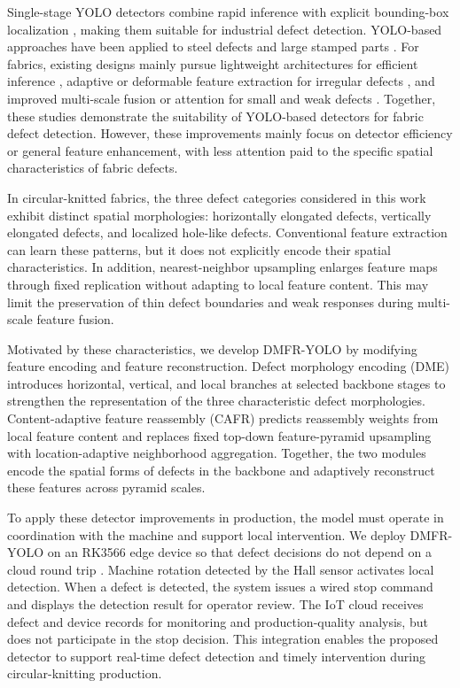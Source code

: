 \documentclass[journal]{IEEEtran}
\newcommand{\model}{DMFR-YOLO\xspace}
\begin{document}
Single-stage YOLO detectors combine rapid inference with explicit bounding-box localization \cite{redmon2016yolo}, making them suitable for industrial defect detection. YOLO-based approaches have been applied to steel defects and large stamped parts \cite{gao2024srnyolo,li2024yoloxsteel,dong2024snf}. For fabrics, existing designs mainly pursue lightweight architectures for efficient inference \cite{kang2024ayolov7,yang2024yolov4tinys}, adaptive or deformable feature extraction for irregular defects \cite{luo2023deformableyolo,zhang2025dghr}, and improved multi-scale fusion or attention for small and weak defects \cite{yue2022tiny,yu2024fayolo,chen2025yolov8,wang2025srseyolo,gao2026yolov8,xu2025yolodll}. Together, these studies demonstrate the suitability of YOLO-based detectors for fabric defect detection. However, these improvements mainly focus on detector efficiency or general feature enhancement, with less attention paid to the specific spatial characteristics of fabric defects.

In circular-knitted fabrics, the three defect categories considered in this work exhibit distinct spatial morphologies: horizontally elongated defects, vertically elongated defects, and localized hole-like defects. Conventional feature extraction can learn these patterns, but it does not explicitly encode their spatial characteristics. In addition, nearest-neighbor upsampling enlarges feature maps through fixed replication without adapting to local feature content. This may limit the preservation of thin defect boundaries and weak responses during multi-scale feature fusion.

Motivated by these characteristics, we develop \model by modifying feature encoding and feature reconstruction. Defect morphology encoding (DME) introduces horizontal, vertical, and local branches at selected backbone stages to strengthen the representation of the three characteristic defect morphologies. Content-adaptive feature reassembly (CAFR) predicts reassembly weights from local feature content and replaces fixed top-down feature-pyramid upsampling with location-adaptive neighborhood aggregation. Together, the two modules encode the spatial forms of defects in the backbone and adaptively reconstruct these features across pyramid scales.

To apply these detector improvements in production, the model must operate in coordination with the machine and support local intervention. We deploy \model on an RK3566 edge device so that defect decisions do not depend on a cloud round trip \cite{shi2016edge}. Machine rotation detected by the Hall sensor activates local detection. When a defect is detected, the system issues a wired stop command and displays the detection result for operator review. The IoT cloud receives defect and device records for monitoring and production-quality analysis, but does not participate in the stop decision. This integration enables the proposed detector to support real-time defect detection and timely intervention during circular-knitting production.
\end{document}

